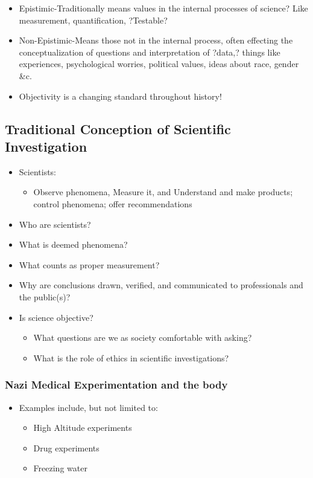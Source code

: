 \documentclass[11pt]{article}
\begin{document}
\begin{itemize}
\item Epistimic-Traditionally means values in the internal processes of science? 
  Like measurement, quantification, ?Testable?
\item Non-Epistimic-Means those not in the internal process, often effecting the conceptualization of questions and interpretation of ?data,? things like experiences, psychological worries, political values, ideas about race, gender \&c.
\item Objectivity is a changing standard throughout history!
\end{itemize}
\subsection{Traditional Conception of Scientific Investigation}
\label{sec-2.2}

\begin{itemize}
\item Scientists:

\begin{itemize}
\item Observe phenomena, Measure it, and Understand and make products; control phenomena; offer recommendations
\end{itemize}

\item Who are scientists?
\item What is deemed phenomena?
\item What counts as proper measurement?
\item Why are conclusions drawn, verified, and communicated to professionals and the public(s)?
\item Is science objective?

\begin{itemize}
\item What questions are we as society comfortable with asking?
\item What is the role of ethics in scientific investigations?
\end{itemize}

\end{itemize}
\subsubsection{Nazi Medical Experimentation and the body}
\label{sec-2.2.1}


\begin{itemize}
\item Examples include, but not limited to:

\begin{itemize}
\item High Altitude experiments
\item Drug experiments
\item Freezing water
\end{itemize}

\end{itemize}
\end{document}

